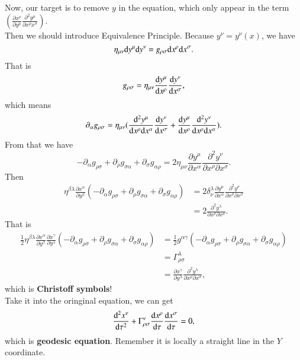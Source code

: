 \documentclass[openany,10pt]{book}
\theoremstyle{definition}
\theoremstyle{definition}
\theoremstyle{remark}
\begin{document}
Now, our target is to remove $y$ in the equation, which only appear in the term $(\frac{\partial x^\nu}{\partial y^\mu}\frac{\partial^2y^\mu}{\partial x^\rho x^\sigma})$.\\
Then we should introduce Equivalence Principle. Because $y^\nu=y^\nu(x)$, we have 
\begin{equation}
    \eta_{\mu\nu}{\rm{d}}y^\mu{\rm{d}}y^\nu=g_{\rho\sigma}{\rm{d}}x^\rho{\rm{d}}x^\sigma.
\end{equation}
That is 
\begin{equation}
    g_{\rho\sigma}=\eta_{\mu\nu}\frac{{\rm{d}}y^\mu}{{\rm{d}}x^{\rho}}\frac{{\rm{d}}y^\nu}{{\rm{d}}x^\sigma},
\end{equation}
which means 
\begin{equation}
    \partial_\alpha g_{\rho\sigma}=\eta_{\mu\nu}(\frac{{\rm{d}}^2y^\mu}{{\rm{d}}x^\rho{\rm{d}}x^\alpha}\frac{{\rm{d}}y^\nu}{{\rm{d}}x^\sigma}+\frac{{\rm{d}}y^\mu}{{\rm{d}}x^\rho}\frac{{\rm{d}}^2y^\nu}{{\rm{d}}x^\rho{\rm{d}}x^\alpha}).
\end{equation}
From that we have 
\begin{equation}
    -\partial_\alpha g_{\rho\sigma}+\partial_\rho g_{\sigma\alpha}+\partial_\sigma g_{\alpha\rho}=2\eta_{\mu\nu}\frac{\partial y^\mu}{\partial x^\alpha}\frac{\partial^2y^\nu}{\partial x^\rho\partial x^\sigma}.
\end{equation}
Then 
\begin{equation}
    \begin{aligned}
    \eta^{\beta\lambda}\frac{\partial x^\alpha}{\partial y^\beta}( -\partial_\alpha g_{\rho\sigma}+\partial_\rho g_{\sigma\alpha}+\partial_\sigma g_{\alpha\rho})&=2 \delta^\lambda_\nu\frac{\partial y^\mu}{\partial x^\alpha}\frac{\partial^2y^\nu}{\partial x^\rho\partial x^\sigma}\\
    &=2\frac{\partial^2y^\lambda}{\partial x^\rho\partial x^\sigma}.
    \end{aligned}
\end{equation}
That is 
\begin{equation}
    \begin{aligned}
    \frac{1}{2} \eta^{\beta\lambda}\frac{\partial x^\alpha}{\partial y^\beta}\frac{\partial x^\gamma}{\partial y^\lambda}( -\partial_\alpha g_{\rho\sigma}+\partial_\rho g_{\sigma\alpha}+\partial_\sigma g_{\alpha\rho})&=\frac{1}{2}g^{\alpha\gamma}( -\partial_\alpha g_{\rho\sigma}+\partial_\rho g_{\sigma\alpha}+\partial_\sigma g_{\alpha\rho})\\
    &=\Gamma^\lambda_{\rho\sigma}\\
    &=\frac{\partial x^\gamma}{\partial y^\lambda}\frac{\partial^2y^\lambda}{\partial x^\rho\partial x^\sigma},
    \end{aligned}
\end{equation}
which is \textbf{Christoff symbols}!\\
Take it into the oringinal equation, we can get 
\begin{equation}
    \frac{{\rm d}^2x^\nu}{{\rm d}\tau^2}+\Gamma^\nu_{\rho\sigma}\frac{{\rm d}x^\rho}{{\rm d}\tau}\frac{{\rm d}x^\sigma}{{\rm d}\tau}=0,
\end{equation}
which is \textbf{geodesic equation}. Remember it is locally a straight line in the $Y$ coordinate.
\end{document}
